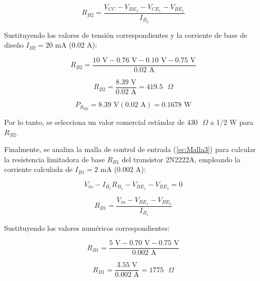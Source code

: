 \documentclass[journal]{IEEEtran}
\begin{document}
    \begin{equation*}
        R_{B2} = \frac{V_{CC} - V_{BE_{2}} - V_{CE_{1}} - V_{BE_{5}}}{I_{B_{2}}}
    \end{equation*}

    Sustituyendo los valores de tensión correspondientes y la corriente de base de 
    diseño $I_{B2} = 20\text{ mA}$ ($0.02\text{ A}$):

    \begin{equation*}
        R_{B2} = \frac{10\text{ V} - 0.76\text{ V} - 0.10\text{ V} - 0.75\text{ V}}{0.02\text{ A}}
    \end{equation*}

    \begin{equation*}
        R_{B2} = \frac{8.39\text{ V}}{0.02\text{ A}} = 419.5\text{ }\Omega
    \end{equation*}

    \begin{equation*}
        P_{R_{B2}} = 8.39\text{ V} (0.02\text{ A}) = 0.1678\text{ W}
    \end{equation*}

    Por lo tanto, se selecciona un valor comercial estándar de $430\text{ }\Omega$ a 1/2 W para $R_{B2}$.

    Finalmente, se analiza la malla de control de entrada (\ref{ec:Malla3}) para calcular la resistencia limitadora de base $R_{B1}$ del transistor 2N2222A, empleando la corriente calculada de $I_{B1} = 2\text{ mA}$ ($0.002\text{ A}$):

    \begin{equation*}
        V_{in} - I_{B_{1}} R_{B_{1}} - V_{BE_{1}} - V_{BE_{5}} = 0
    \end{equation*}

    \begin{equation*}
        R_{B1} = \frac{V_{in} - V_{BE_{1}} - V_{BE_{5}}}{I_{B_{1}}}
    \end{equation*}

    Sustituyendo los valores numéricos correspondientes:

    \begin{equation*}
        R_{B1} = \frac{5\text{ V} - 0.70\text{ V} - 0.75\text{ V}}{0.002\text{ A}}
    \end{equation*}

    \begin{equation*}
        R_{B1} = \frac{3.55\text{ V}}{0.002\text{ A}} = 1775\text{ }\Omega
    \end{equation*}
\end{document}
